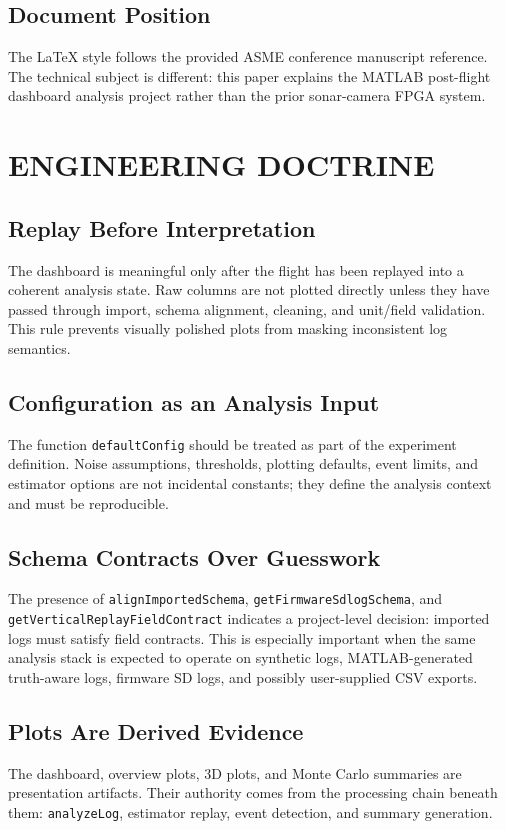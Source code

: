 \documentclass[colorlinks,upint,subscriptcorrection,varvw,hyphenate,balance]{asmeconf}
\newcommand{\code}[1]{\texttt{\allowbreak#1}}
\begin{document}
\subsection{Document Position}
The LaTeX style follows the provided ASME conference manuscript reference. The technical subject is different: this paper explains the MATLAB post-flight dashboard analysis project rather than the prior sonar-camera FPGA system.

\section{ENGINEERING DOCTRINE}

\subsection{Replay Before Interpretation}
The dashboard is meaningful only after the flight has been replayed into a coherent analysis state. Raw columns are not plotted directly unless they have passed through import, schema alignment, cleaning, and unit/field validation. This rule prevents visually polished plots from masking inconsistent log semantics.

\subsection{Configuration as an Analysis Input}
The function \code{defaultConfig} should be treated as part of the experiment definition. Noise assumptions, thresholds, plotting defaults, event limits, and estimator options are not incidental constants; they define the analysis context and must be reproducible.

\subsection{Schema Contracts Over Guesswork}
The presence of \code{alignImportedSchema}, \code{getFirmwareSdlogSchema}, and \code{getVerticalReplayFieldContract} indicates a project-level decision: imported logs must satisfy field contracts. This is especially important when the same analysis stack is expected to operate on synthetic logs, MATLAB-generated truth-aware logs, firmware SD logs, and possibly user-supplied CSV exports.

\subsection{Plots Are Derived Evidence}
The dashboard, overview plots, 3D plots, and Monte Carlo summaries are presentation artifacts. Their authority comes from the processing chain beneath them: \code{analyzeLog}, estimator replay, event detection, and summary generation.
\end{document}
